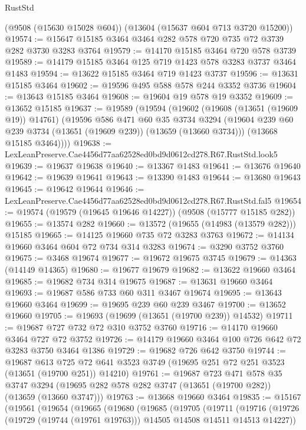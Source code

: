 \begin{lexlean}{RustStd}
\begin{coremodule}
    (@9508 (@15630 @15028 @604))
    (@13604 (@15637 @604 @713 @3720 @15200))
@19574 := @15647 @15185 @3464 @3464 @282 @578 @720 @735 @72 @3739 @282 @3730 @3283 @3764
@19579 := @14170 @15185 @3464 @720 @578 @3739
@19589 := @14179 @15185 @3464 @125 @719 @1423 @578 @3283 @3737 @3464 @1483
@19594 := @13622 @15185 @3464 @719 @1423 @3737
@19596 := @13631 @15185 @3464
@19602 := @19596 @495 @588 @578 @244 @3352 @3736
@19604 := @13643 @15185 @3464
@19608 := @19604 @19 @578 @19 @3352
@19609 := @13652 @15185
@19637 := @19589
    (@19594
      (@19602
        (@19608 (@13651 (@19609 @19)) @14761)
        (@19596
          @586
          @471
          @60
          @35
          @3734
          @3294
          (@19604 @239 @60 @239 @3734 (@13651 (@19609 @239)) (@13659 (@13660 @3734)))
          (@13668 @15185 @3464))))
@19638 := LexLeanPreserve.Cae4456d77aa62528ed0bd9d0612cd278.R67.RustStd.look5
@19639 := @19637 @19638
@19640 := @13367 @1483
@19641 := @13676 @19640
@19642 := @19639 @19641
@19643 := @13390 @1483
@19644 := @13680 @19643
@19645 := @19642 @19644
@19646 := LexLeanPreserve.Cae4456d77aa62528ed0bd9d0612cd278.R67.RustStd.fal5
@19654 := @19574 (@19579 (@19645 @19646 @14227)) (@9508 (@15777 @15185 @282))
@19655 := @13574 @282
@19660 := @13572 (@19655 (@14983 (@13579 @282))) @15185
@19665 := @14125 @19660 @735 @72 @3283 @3763
@19672 := @14134 @19660 @3464 @604 @72 @734 @314 @3283
@19674 := @3290 @3752 @3760
@19675 := @3468 @19674
@19677 := @19672 @19675 @3745
@19679 := @14363 (@14149 @14365)
@19680 := @19677 @19679
@19682 := @13622 @19660 @3464
@19685 := @19682 @734 @314 @19675
@19687 := @13631 @19660 @3464
@19693 := @19687 @586 @733 @60 @311 @3467 @19674
@19695 := @13643 @19660 @3464
@19699 := @19695 @239 @60 @239 @3467
@19700 := @13652 @19660
@19705 := @19693 (@19699 (@13651 (@19700 @239)) @14532)
@19711 := @19687 @727 @732 @72 @310 @3752 @3760
@19716 := @14170 @19660 @3464 @727 @72 @3752
@19726 := @14179 @19660 @3464 @100 @726 @642 @72 @3283 @3750 @3464 @1386
@19729 := @19682 @726 @642 @3750
@19744 := @19687
    @613
    @725
    @72
    @641
    @3523
    @3749
    (@19695 @251 @72 @251 @3523 (@13651 (@19700 @251)) @14210)
@19761 := @19687
    @723
    @471
    @578
    @35
    @3747
    @3294
    (@19695 @282 @578 @282 @3747 (@13651 (@19700 @282)) (@13659 (@13660 @3747)))
@19763 := @13668 @19660 @3464
@19835 := @15167
    (@19561
      (@19654
        (@19665
          (@19680
            (@19685
              (@19705
                (@19711
                  (@19716
                    (@19726 (@19729 (@19744 (@19761 @19763))) @14505 @14508 @14511 @14513 @14227))

\end{coremodule}
\end{lexlean}
